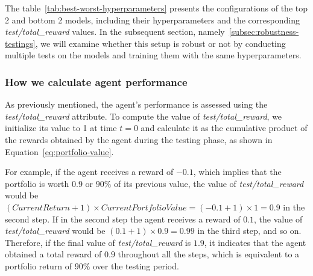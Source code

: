 \documentclass[../xlapes02]{subfiles}
\begin{document}
    The table~\cref{tab:best-worst-hyperparameters} presents the configurations of the top 2 and bottom 2 models, including their hyperparameters and the corresponding \emph{test/total\_reward} values. In the subsequent section, namely~\cref{subsec:robustness-testings}, we will examine whether this setup is robust or not by conducting multiple tests on the models and training them with the same hyperparameters.

    \subsubsection{How we calculate agent performance}\label{subsubsec:how_we_calculate_agent_performance}
    As previously mentioned, the agent's performance is assessed using the \emph{test/total\_reward} attribute. To compute the value of \emph{test/total\_reward}, we initialize its value to 1 at time $t=0$ and calculate it as the cumulative product of the rewards obtained by the agent during the testing phase, as shown in Equation~\cref{eq:portfolio-value}.

    For example, if the agent receives a reward of $-0.1$, which implies that the portfolio is worth $0.9$ or $90\%$ of its previous value, the value of \emph{test/total\_reward} would be $(CurrentReturn+1)\times CurrentPortfolioValue = (-0.1+1)\times 1 = 0.9$ in the second step. If in the second step the agent receives a reward of $0.1$, the value of \emph{test/total\_reward} would be $(0.1+1) \times 0.9 = 0.99$ in the third step, and so on. Therefore, if the final value of \emph{test/total\_reward} is $1.9$, it indicates that the agent obtained a total reward of $0.9$ throughout all the steps, which is equivalent to a portfolio return of $90\%$ over the testing period.

\end{document}
